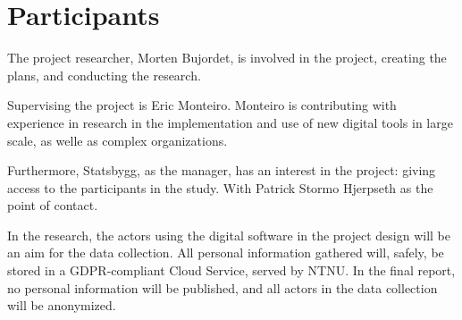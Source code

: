 \section{Participants}

The project researcher, Morten Bujordet, is involved in the project, creating the plans, and conducting the research.
	 
Supervising the project is Eric Monteiro. Monteiro is contributing with experience in research in the implementation and use of new digital tools in large scale, as welle as complex organizations. 

Furthermore, Statsbygg, as the manager, has an interest in the project: giving access to the participants in the study. With Patrick Stormo Hjerpseth as the point of contact.
	 
In the research, the actors using the digital software in the project design will be an aim for the data collection. All personal information gathered will, safely, be stored in a GDPR-compliant Cloud Service, served by NTNU. In the final report, no personal information will be published, and all actors in the data collection will be anonymized.


